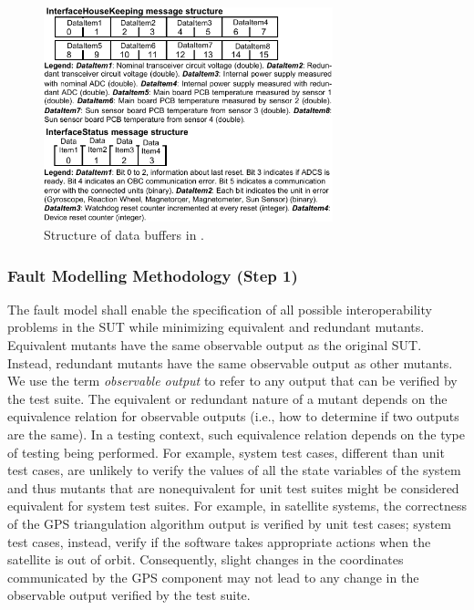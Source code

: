\begin{figure}
	\centering
		\includegraphics[width=8.4cm]{damat/images/BufferStructuresSmall}
		\caption{Structure of data buffers in \ESAIL.}
		\label{fig:appr:bufferStructure}
	\end{figure}
	
	

\clearpage


\subsubsection{Fault Modelling Methodology (Step 1)}
\label{sec:methodology}



The fault model shall enable the specification of 
all possible interoperability problems in the SUT while minimizing equivalent and redundant mutants.
Equivalent mutants have the same observable output as the original SUT. 
Instead, redundant mutants have the same observable output as other mutants.
We use the term \emph{observable output} to refer to any output that can be verified by the test suite.
The equivalent or redundant nature of a mutant depends
on the equivalence relation for observable outputs
(i.e., how to determine if two outputs are the same).
In a testing context, such equivalence relation depends on the type of testing being performed. For example, system test cases, different than unit test cases,  are unlikely to verify the values of all the state variables of the system and thus mutants that are nonequivalent for unit test suites might be considered equivalent for system test suites. 
For example, in satellite systems, the correctness of the GPS triangulation algorithm output is verified by unit test cases; system test cases, instead, verify 
if the software takes appropriate actions when the satellite is out of orbit. Consequently, slight changes in the coordinates communicated by the GPS component may not lead to any change in the observable output verified by the test suite.


